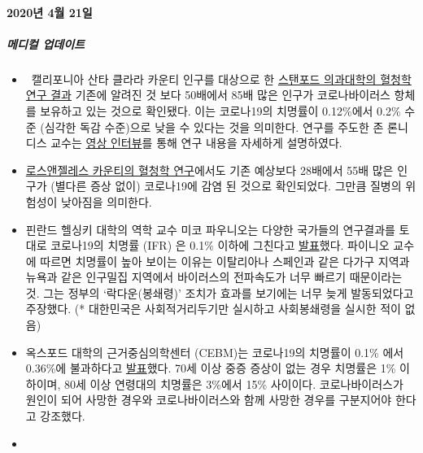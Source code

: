 \hypertarget{2020uxb144-4uxc6d4-21uxc77c}{%
\paragraph{2020년 4월 21일}\label{2020uxb144-4uxc6d4-21uxc77c}}

\hypertarget{uxba54uxb514uxceec-uxc5c5uxb370uxc774uxd2b8}{%
\subparagraph{\texorpdfstring{\textbf{메디컬
업데이트}}{메디컬 업데이트}}\label{uxba54uxb514uxceec-uxc5c5uxb370uxc774uxd2b8}}

\begin{itemize}
\tightlist
\item
  ~캘리포니아 산타 클라라 카운티 인구를 대상으로 한
  \href{https://www.medrxiv.org/content/10.1101/2020.04.14.20062463v1}{스탠포드
  의과대학의 혈청학 연구 결과} 기존에 알려진 것 보다 50배에서 85배 많은
  인구가 코로나바이러스 항체를 보유하고 있는 것으로 확인됐다. 이는
  코로나19의 치명률이 0.12\%에서 0.2\% 수준 (심각한 독감 수준)으로 낮을
  수 있다는 것을 의미한다. 연구를 주도한 존 론니디스 교수는
  \href{https://www.youtube.com/watch?v=jGUgrEfSgaU}{영상 인터뷰}를 통해
  연구 내용을 자세하게 설명하였다. 
\item
  \href{http://publichealth.lacounty.gov/phcommon/public/media/mediapubhpdetail.cfm?prid=2328}{로스앤젤레스
  카운티의 혈청학 연구}에서도 기존 예상보다 28배에서 55배 많은 인구가
  (별다른 증상 없이) 코로나19에 감염 된 것으로 확인되었다. 그만큼 질병의
  위험성이 낮아짐을 의미한다.
\item
  핀란드 헬싱키 대학의 역학 교수 미코 파우니오는 다양한 국가들의
  연구결과를 토대로 코로나19의 치명률 (IFR) 은 0.1\% 이하에 그친다고
  \href{https://lockdownsceptics.org/wp-content/uploads/2020/04/How-the-World-got-Fooled-by-COVID-ed-2c.pdf}{발표}했다.
  파이니오 교수에 따르면 치명률이 높아 보이는 이유는 이탈리아나 스페인과
  같은 다가구 지역과 뉴욕과 같은 인구밀집 지역에서 바이러스의 전파속도가
  너무 빠르기 때문이라는 것. 그는 정부의 `락다운(봉쇄령)' 조치가 효과를
  보기에는 너무 늦게 발동되었다고 주장했다. (* 대한민국은
  사회적거리두기만 실시하고 사회봉쇄령을 실시한 적이 없음) 
\item
  옥스포드 대학의 근거중심의학센터 (CEBM)는 코로나19의 치명률이 0.1\%
  에서 0.36\%에 불과하다고
  \href{https://www.cebm.net/covid-19/global-covid-19-case-fatality-rates/}{발표}했다.
  70세 이상 중증 증상이 없는 경우 치명률은 1\% 이하이며, 80세 이상
  연령대의 치명률은 3\%에서 15\% 사이이다. 코로나바이러스가 원인이 되어
  사망한 경우와 코로나바이러스와 함께 사망한 경우를 구분지어야 한다고
  강조했다. 
\item

\end{itemize}

